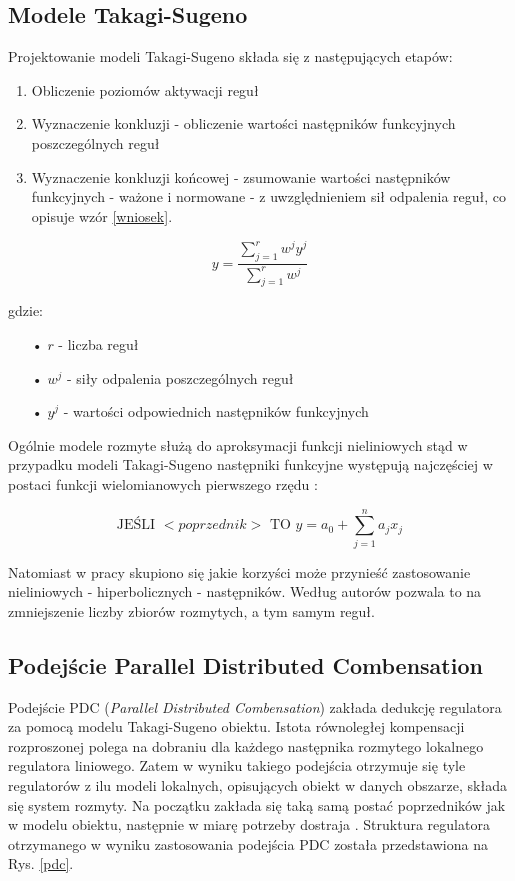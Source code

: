 \subsection{Modele Takagi-Sugeno}
Projektowanie modeli Takagi-Sugeno składa się z następujących etapów:

\begin{enumerate}
\item Obliczenie poziomów aktywacji reguł
\item Wyznaczenie konkluzji - obliczenie wartości następników funkcyjnych poszczególnych reguł
\item Wyznaczenie konkluzji końcowej - zsumowanie wartości następników funkcyjnych - ważone i normowane - z uwzględnieniem sił odpalenia reguł, co opisuje wzór \ref{wniosek}.
\end{enumerate}

\begin{equation}
y = \frac{\sum_{j=1}^r w^j y^j}{\sum_{j=1}^r w^j}
\label{wniosek}
\end{equation}

\noindent gdzie:
\begin{itemize}
\item[•] $r$ - liczba reguł
\item[•] $w^j$ - siły odpalenia poszczególnych reguł
\item[•] $y^j$ - wartości odpowiednich następników funkcyjnych
\end{itemize}

Ogólnie modele rozmyte służą do aproksymacji funkcji nieliniowych stąd w przypadku modeli Takagi-Sugeno następniki funkcyjne występują najczęściej w postaci funkcji wielomianowych pierwszego rzędu \cite{160, 170}:

\begin{equation}
\text{JEŚLI } <poprzednik> \text{ TO } y = a_0 + \sum_{j=1}^n a_jx_j
\end{equation} 

Natomiast w pracy skupiono się jakie korzyści może przynieść zastosowanie nieliniowych - hiperbolicznych - następników. Według autorów \cite{80} pozwala to na zmniejszenie liczby zbiorów rozmytych, a tym samym reguł.

\newpage

\subsection{Podejście Parallel Distributed Combensation}
Podejście PDC (\textit{Parallel Distributed Combensation}) zakłada dedukcję regulatora za pomocą modelu Takagi-Sugeno obiektu. Istota równoległej kompensacji rozproszonej polega na dobraniu dla każdego następnika rozmytego lokalnego regulatora liniowego. Zatem w wyniku takiego podejścia otrzymuje się tyle regulatorów z ilu modeli lokalnych, opisujących obiekt w danych obszarze, składa się system rozmyty. Na początku zakłada się taką samą postać poprzedników jak w modelu obiektu, następnie w miarę potrzeby dostraja \cite{120, 170}. Struktura regulatora otrzymanego w wyniku zastosowania podejścia PDC została przedstawiona na Rys. \ref{pdc}.

